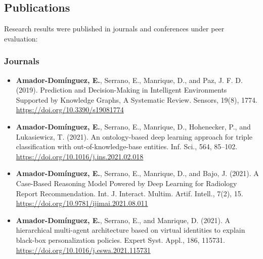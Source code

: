\subsection{Publications}
Research results were published in journals and conferences under peer evaluation: 
\subsubsection*{Journals}
\begin{itemize}
    \item \textbf{Amador-Domínguez, E.}, Serrano, E., Manrique, D., and Paz, J. F. D. (2019). Prediction and Decision-Making in Intelligent Environments Supported by Knowledge Graphs, A Systematic Review. Sensors, 19(8), 1774. \url{https://doi.org/10.3390/s19081774} 
    \item \textbf{Amador-Domínguez, E.}, Serrano, E., Manrique, D., Hohenecker, P., and Lukasiewicz, T. (2021). An ontology-based deep learning approach for triple classification with out-of-knowledge-base entities. Inf. Sci., 564, 85–102. \url{https://doi.org/10.1016/j.ins.2021.02.018} 
    \item \textbf{Amador-Domínguez, E.}, Serrano, E., Manrique, D., and Bajo, J. (2021). A Case-Based Reasoning Model Powered by Deep Learning for Radiology Report Recommendation. Int. J. Interact. Multim. Artif. Intell., 7(2), 15. \url{https://doi.org/10.9781/ijimai.2021.08.011} 
    \item \textbf{Amador-Domínguez, E.}, Serrano, E., and Manrique, D. (2021). A hierarchical multi-agent architecture based on virtual identities to explain black-box personalization policies. Expert Syst. Appl., 186, 115731. \url{https://doi.org/10.1016/j.eswa.2021.115731} 
\end{itemize}
